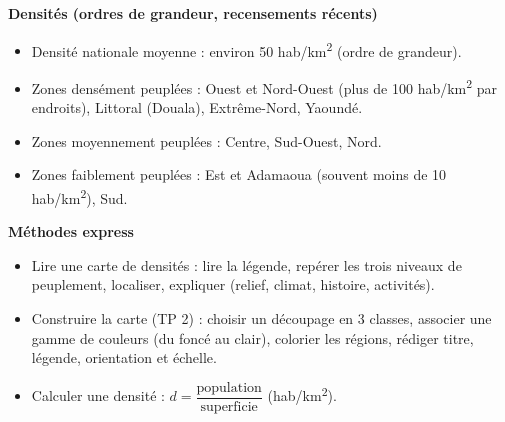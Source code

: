 \documentclass[11pt]{article}
\newcommand{\cle}[1]{{\popxbold\color{popdark}#1}}
\begin{document}
\begin{bilan}
\textbf{Densités (ordres de grandeur, recensements récents)}
\begin{itemize}
  \item Densité nationale moyenne : environ 50 hab/km\textsuperscript{2} (ordre de grandeur).
  \item Zones \cle{densément peuplées} : Ouest et Nord-Ouest (plus de 100 hab/km\textsuperscript{2} par endroits), Littoral (Douala), Extrême-Nord, Yaoundé.
  \item Zones \cle{moyennement peuplées} : Centre, Sud-Ouest, Nord.
  \item Zones \cle{faiblement peuplées} : Est et Adamaoua (souvent moins de 10 hab/km\textsuperscript{2}), Sud.
\end{itemize}

\textbf{Méthodes express}
\begin{itemize}
  \item \cle{Lire une carte de densités} : lire la légende, repérer les trois niveaux de peuplement, localiser, expliquer (relief, climat, histoire, activités).
  \item \cle{Construire la carte (TP 2)} : choisir un découpage en 3 classes, associer une gamme de couleurs (du foncé au clair), colorier les régions, rédiger titre, légende, orientation et échelle.
  \item \cle{Calculer une densité} : $d = \dfrac{\text{population}}{\text{superficie}}$ (hab/km\textsuperscript{2}).
\end{itemize}
\end{bilan}
\end{document}

